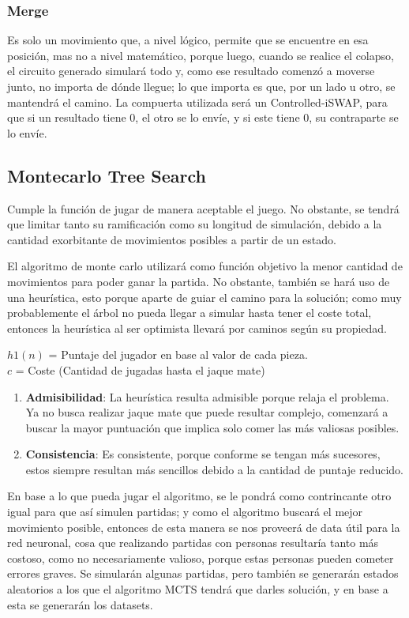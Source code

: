 \subsubsection{Merge}
Es solo un movimiento que, a nivel lógico, permite que se encuentre en esa posición, mas no a nivel matemático, porque luego, cuando se realice el colapso, el circuito generado simulará todo y, como ese resultado comenzó a moverse junto, no importa de dónde llegue; lo que importa es que, por un lado u otro, se mantendrá el camino. La compuerta utilizada será un Controlled-iSWAP, para que si un resultado tiene 0, el otro se lo envíe, y si este tiene 0, su contraparte se lo envíe.

\subsection{Montecarlo Tree Search}
Cumple la función de jugar de manera aceptable el juego. No obstante, se tendrá que limitar tanto su ramificación como su longitud de simulación, debido a la cantidad exorbitante de movimientos posibles a partir de un estado.

El algoritmo de monte carlo utilizará como función objetivo la menor cantidad de movimientos para poder ganar la partida. No obstante, también se hará uso de una heurística, esto porque aparte de guiar el camino para la solución; como muy probablemente el árbol no pueda llegar a simular hasta tener el coste total, entonces la heurística al ser optimista llevará por caminos según su propiedad.\newline

$h1(n)$ = Puntaje del jugador en base al valor de cada pieza.\\

$c$ = Coste (Cantidad de jugadas hasta el jaque mate)

\begin{enumerate}
    \item \textbf{Admisibilidad}: La heurística resulta admisible porque relaja el problema. Ya no busca realizar jaque mate que puede resultar complejo, comenzará a buscar la mayor puntuación que implica solo comer las más valiosas posibles.
    \item \textbf{Consistencia}: Es consistente, porque conforme se tengan más sucesores, estos siempre resultan más sencillos debido a la cantidad de puntaje reducido.
\end{enumerate}

En base a lo que pueda jugar el algoritmo, se le pondrá como contrincante otro igual para que así simulen partidas; y como el algoritmo buscará el mejor movimiento posible, entonces de esta manera se nos proveerá de data útil para la red neuronal, cosa que realizando partidas con personas resultaría tanto más costoso, como no necesariamente valioso, porque estas personas pueden cometer errores graves. Se simularán algunas partidas, pero también se generarán estados aleatorios a los que el algoritmo MCTS tendrá que darles solución, y en base a esta se generarán los datasets.

